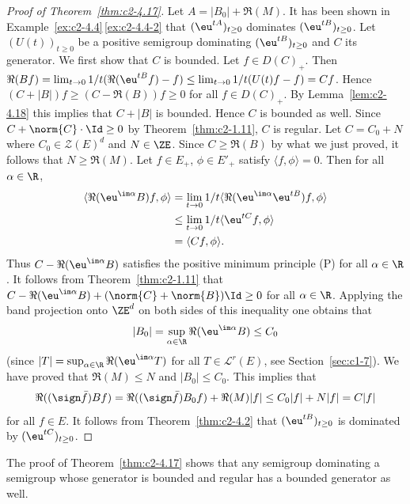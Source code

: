 \begin{proof}[Proof of Theorem~\ref{thm:c2-4.17}]
Let $A = |B_{0}| + \Re(M)$. 
It has been shown in Example~\ref{ex:c2-4.4}\,\ref{ex:c2-4.4-2} that $(\eu^{tA})_{t \geq 0}$ dominates $(\eu^{tB})_{t \geq 0}$.
Let $(U(t))_{t \geq 0}$ be a positive semigroup dominating $(\eu^{tB})_{t \geq 0}$ and $C$ its generator.
We first show that $C$ is bounded.
Let $f \in D(C)_{+}$. Then $\Re(Bf) = \lim_{t \to 0} 1/t(\Re(\eu^{tB}f) - f) \leq \lim_{t \to 0} 1/t(U(t)f - f) = Cf$.
Hence $(C + |B|)f \geq (C - \Re(B))f \geq 0$ for all $f \in D(C)_{+}$.
By Lemma~\ref{lem:c2-4.18} this implies that $C + |B|$ is bounded.
Hence $C$ is bounded as well.
Since $C + \norm{C} \cdot \Id \geq 0$ by Theorem~\ref{thm:c2-1.11}, $C$ is regular.
Let $C = C_{0} + N$ where $C_{0} \in \mathcal{Z}(E)^{d}$ and $N \in \ZE$.
Since $C \geq \Re(B)$ by what we just proved, it follows that $N \geq \Re(M)$.
Let $f \in E_{+}$, $\phi \in E'_{+}$ satisfy $\langle f,\phi \rangle = 0$.
Then for all $\alpha \in \R$,
\begin{align*}
\langle \Re(\eu^{\im \alpha}B)f,\phi \rangle &= \lim_{t \to 0}1/t \langle \Re(\eu^{\im \alpha}\eu^{tB})f,\phi \rangle \\
&\leq \lim_{t \to 0}1/t \langle \eu^{tC}f,\phi \rangle \\
&= \langle Cf,\phi \rangle.
\end{align*}
Thus $C - \Re(\eu^{\im \alpha}B)$ satisfies the positive minimum principle (P) 
for all $\alpha \in \R$.
It follows from Theorem~\ref{thm:c2-1.11} that $C - \Re(\eu^{\im \alpha}B) + (\norm{C}+\norm{B})\Id \geq 0$ for all $\alpha \in \R$.
Applying the band projection onto $\ZE^{d}$ on both sides of this inequality one obtains that
\[
|B_{0}| = \sup_{\alpha \in \R}\Re(\eu^{\im \alpha}B) \leq C_{0} 
\]
(since $|T| = \sup_{\alpha \in \R}\Re(\eu^{\im \alpha}T)$ for all $T \in \mathcal{L}^{r}(E)$, see Section~\ref{sec:c1-7}).
We have proved that $\Re(M) \leq N$ and $|B_{0}| \leq C_{0}$.
This implies that
\[
\Re((\sign  \bar{f})Bf) = \Re((\sign  \bar{f})B_{0}f) + \Re(M)|f| \leq C_{0}|f| + N|f| = C|f|
\]
for all $f \in E$.
It follows from Theorem~\ref{thm:c2-4.2}   that $(\eu^{tB})_{t \geq 0}$ is dominated by $(\eu^{tC})_{t \geq 0}$.
\end{proof}

\begin{remark*}
The proof of Theorem~\ref{thm:c2-4.17}   shows that any semigroup dominating a semigroup whose generator is bounded and regular has a bounded generator as well.
\end{remark*}

